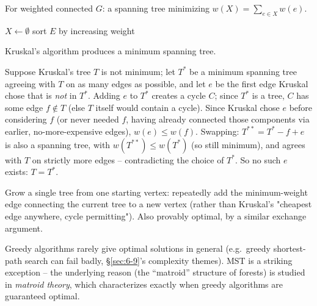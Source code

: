 \documentclass[11pt]{article}
\begin{document}
\bigskip
\begin{definition}
For weighted connected $G$: a spanning tree minimizing $w(X)=\sum_{e\in X}w(e)$.
\end{definition}

\begin{algorithm}[H]
\SetAlgoLined
{}
$X\gets\emptyset$\;
sort $E$ by increasing weight\;
\caption{Kruskal's algorithm}
\end{algorithm}

\begin{theorem}
Kruskal's algorithm produces a minimum spanning tree.
\end{theorem}
\begin{note}
Suppose Kruskal's tree $T$ is not minimum; let $T^*$ be a minimum spanning tree agreeing with $T$ on as many edges as possible, and let $e$ be the first edge Kruskal chose that is \emph{not} in $T^*$. Adding $e$ to $T^*$ creates a cycle $C$; since $T^*$ is a tree, $C$ has some edge $f\notin T$ (else $T$ itself would contain a cycle). Since Kruskal chose $e$ before considering $f$ (or never needed $f$, having already connected those components via earlier, no-more-expensive edges), $w(e)\le w(f)$. Swapping: $T^{**}=T^*-f+e$ is also a spanning tree, with $w(T^{**})\le w(T^*)$ (so still minimum), and agrees with $T$ on strictly more edges -- contradicting the choice of $T^*$. So no such $e$ exists: $T=T^*$.
\end{note}

\begin{note}
Grow a single tree from one starting vertex: repeatedly add the minimum-weight edge connecting the current tree to a new vertex (rather than Kruskal's "cheapest edge anywhere, cycle permitting"). Also provably optimal, by a similar exchange argument.
\end{note}

\begin{note}
Greedy algorithms rarely give optimal solutions in general (e.g.\ greedy shortest-path search can fail badly, \S\ref{sec:6-9}'s complexity themes). MST is a striking exception -- the underlying reason (the ``matroid'' structure of forests) is studied in \emph{matroid theory}, which characterizes exactly when greedy algorithms are guaranteed optimal.
\end{note}
\end{document}
